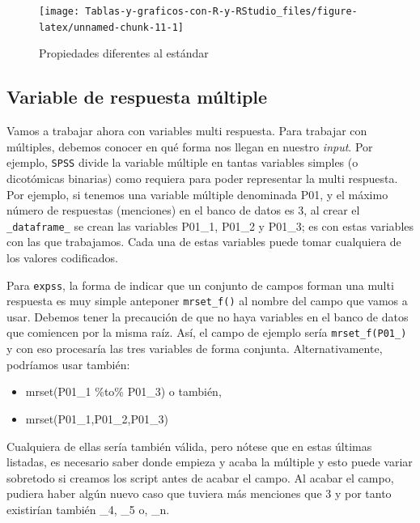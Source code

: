 \documentclass[
]{book}
\providecommand{\tightlist}{%
  \setlength{\itemsep}{0pt}\setlength{\parskip}{0pt}}
\begin{document}
\begin{figure}[H]

{\centering \texttt{[image: Tablas-y-graficos-con-R-y-RStudio\_files/figure-latex/unnamed-chunk-11-1]} 

}

\caption{Propiedades diferentes al estándar}\label{fig:unnamed-chunk-11}
\end{figure}

\hypertarget{variable-de-respuesta-muxfaltiple}{%
\subsection{Variable de respuesta múltiple}\label{variable-de-respuesta-muxfaltiple}}

Vamos a trabajar ahora con variables multi respuesta. Para trabajar con múltiples, debemos conocer en qué forma nos llegan en nuestro \emph{input}. Por ejemplo, \texttt{SPSS} divide la variable múltiple en tantas variables simples (o dicotómicas binarias) como requiera para poder representar la multi respuesta. Por ejemplo, si tenemos una variable múltiple denominada P01, y el máximo número de respuestas (menciones) en el banco de datos es 3, al crear el \texttt{\_dataframe\_} se crean las variables P01\_1, P01\_2 y P01\_3; es con estas variables con las que trabajamos. Cada una de estas variables puede tomar cualquiera de los valores codificados.

Para \texttt{expss}, la forma de indicar que un conjunto de campos forman una multi respuesta es muy simple anteponer \texttt{mrset\_f()} al nombre del campo que vamos a usar. Debemos tener la precaución de que no haya variables en el banco de datos que comiencen por la misma raíz. Así, el campo de ejemplo sería \texttt{mrset\_f(P01\_)} y con eso procesaría las tres variables de forma conjunta. Alternativamente, podríamos usar también:

\begin{itemize}
\tightlist
\item
  mrset(P01\_1 \%to\% P01\_3) o también,
\item
  mrset(P01\_1,P01\_2,P01\_3)
\end{itemize}

Cualquiera de ellas sería también válida, pero nótese que en estas últimas listadas, es necesario saber donde empieza y acaba la múltiple y esto puede variar sobretodo si creamos los script antes de acabar el campo. Al acabar el campo, pudiera haber algún nuevo caso que tuviera más menciones que 3 y por tanto existirían también \_4, \_5 o, \_n.
\end{document}

